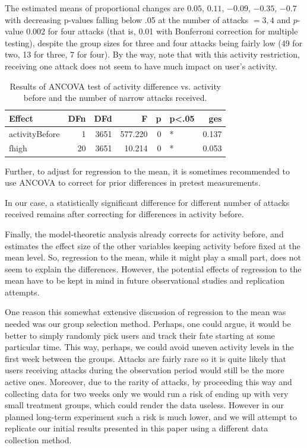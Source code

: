 \documentclass[a4paper,fleqn]{cas-dc}
\begin{document}
\normalsize  The estimated means of proportional changes are
$0.05$, $0.11$, $-0.09$, $-0.35$, $-0.7$ with decreasing p-values falling below
.05 at the number of attacks \(=3, 4\) and \(p\)-value 0.002 for four
attacks (that is, 0.01 with Bonferroni correction for multiple testing),
despite the group sizes for three and four attacks being fairly low (49
for two, 13 for three, 7 for four). By the way, note that with this
activity restriction, receiving one attack does not seem to have much
impact on user's activity.





\begin{table}
\footnotesize
\begin{tabular}{l|r|r|r|r|l|r}
\hline
Effect & DFn & DFd & F & p & p<.05 & ges\\
\hline
activityBefore & 1 & 3651 & 577.220 & 0 & * & 0.137\\
\hline
fhigh & 20 & 3651 & 10.214 & 0 & * & 0.053\\
\hline
\end{tabular}
\normalsize 
\caption{Results of ANCOVA test of activity difference vs. activity before and the number of narrow attacks received.}
\end{table}

Further, to adjust for regression to the mean, it is sometimes
recommended to use ANCOVA to correct for prior differences in pretest
measurements.

\noindent In our case, a statistically significant difference for
different number of attacks received remains after correcting for
differences in activity before.

Finally, the model-theoretic analysis already corrects for activity
before, and estimates the effect size of the other variables keeping
activity before fixed at the mean level. So, regression to the mean,
while it might play a small part, does not seem to explain the
differences. However, the potential effects of regression to the mean
have to be kept in mind in future observational studies and replication
attempts.

One reason this somewhat extensive discussion of regression to the mean
was needed was our group selection method. Perhaps, one could argue, it
would be better to simply randomly pick users and track their fate
starting at some particular time. This way, perhaps, we could avoid
uneven activity levels in the first week between the groups. Attacks are
fairly rare so it is quite likely that users receiving attacks during the
observation period would still be the more active ones. Moreover, due to
the rarity of attacks, by proceeding this way and collecting data for
two weeks only we would run a risk of ending up with very small
treatment groups, which could render the data useless. However in our
planned long-term experiment such a risk is much lower, and we will
attempt to replicate our initial results presented in this paper using a
different data collection method.
\end{document}

